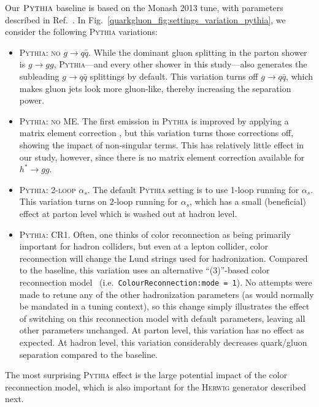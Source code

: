 \documentclass[11pt]{cernrep}
\begin{document}
Our $\textsc{Pythia}$ baseline is based on the Monash 2013 tune, with parameters described in Ref.~\cite{Skands:2014pea}.  In Fig.~\ref{quarkgluon_fig:settings_variation_pythia}, we consider the following \textsc{Pythia} variations:
\begin{itemize}
\item \textsc{Pythia: no $g \to q\bar{q}$}.  While the dominant gluon splitting in the parton shower is $g \to gg$, \textsc{Pythia}---and every other shower in this study---also generates the subleading $g \to q \bar{q}$ splittings by default.  This variation turns off $g \to q \bar{q}$, which makes gluon jets look more gluon-like, thereby increasing the separation power.
\item \textsc{Pythia: no ME}.  The first emission in \textsc{Pythia} is improved by applying a matrix element correction \cite{Miu:1998ju}, but this variation turns those corrections off, showing the impact of non-singular terms.  This has relatively little effect in our study, however, since there is no matrix element correction available for $h^* \to g g$.
\item \textsc{Pythia: 2-loop $\alpha_s$}.  The default \textsc{Pythia} setting is to use 1-loop running for $\alpha_s$.  This variation turns on 2-loop running for $\alpha_s$, which has a small (beneficial) effect at parton level which is washed out at hadron level.
\item \textsc{Pythia: CR1}.  Often, one thinks of color reconnection as being primarily important for hadron colliders, but even at a lepton collider, color reconnection will change the Lund strings used for hadronization.  Compared to the baseline, this variation uses an alternative ``(3)''-based color reconnection model~\cite{Christiansen:2015yqa} (i.e.~\texttt{ColourReconnection:mode = 1}).  No attempts were made to retune any of the other hadronization parameters (as would normally be mandated in a tuning context), so this change simply illustrates the effect of switching on this reconnection model with default parameters, leaving all other parameters unchanged.  At parton level, this variation has no effect as expected.  At hadron level, this variation considerably decreases quark/gluon separation compared to the baseline.
\end{itemize}
The most surprising \textsc{Pythia} effect is the large potential impact of the color reconnection model, which is also important for the \textsc{Herwig} generator described next.
\end{document}
